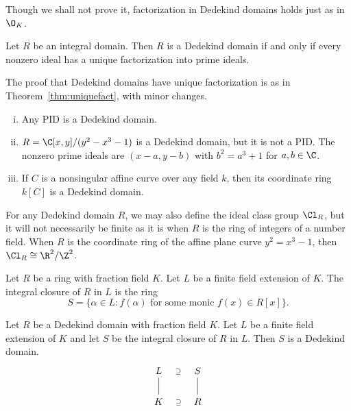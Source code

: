 Though we shall not prove it, factorization in Dedekind domains holds just as in $\O_K$. 

\begin{thm}
Let $R$ be an integral domain. Then $R$ is a Dedekind domain if and only if every nonzero ideal has a unique factorization into prime ideals.
\end{thm}

The proof that Dedekind domains have unique factorization is as in Theorem~\ref{thm:uniquefact}, with minor changes. 

\begin{ex} \hfill
\begin{enumerate}[(i)]
\item Any PID is a Dedekind domain.
\item $R=\C[x,y]/(y^2-x^3-1)$ is a Dedekind domain, but it is not a PID. The nonzero prime ideals are $(x-a,y-b)$ with $b^2=a^3+1$ for $a,b \in \C$.
\item If $C$ is a nonsingular affine curve over any field $k$, then its coordinate ring $k[C]$ is a Dedekind domain. \xqed
\end{enumerate}
\end{ex}

\begin{rem}
For any Dedekind domain $R$, we may also define the ideal class group $\Cl_R$, but it will not necessarily be finite as it is when $R$ is the ring of integers of a number field. When $R$ is the coordinate ring of the affine plane curve $y^2=x^3-1$, then $\Cl_R \cong \R^2/\Z^2$.
\end{rem}

\begin{dfn}
Let $R$ be a ring with fraction field $K$. Let $L$ be a finite field extension of $K$. The integral closure of $R$ in $L$ is the ring
	\[
	S=\{ \alpha \in L \colon f(\alpha) \text{ for some monic } f(x) \in R[x]\}.
	\]
\end{dfn}

\begin{prop}\label{prop:dedekindintcl}
Let $R$ be a Dedekind domain with fraction field $K$. Let $L$ be a finite field extension of $K$ and let $S$ be the integral closure of $R$ in $L$. Then $S$ is a Dedekind domain.
	\[
	\begin{tikzcd}
	L  \arrow[draw=none]{r}[sloped,auto=false]{\supseteq} \arrow[dash]{d} & S \arrow[dash]{d} \\
	K  \arrow[draw=none]{r}[sloped,auto=false]{\supseteq} & R
	\end{tikzcd}
	\]
\end{prop}


